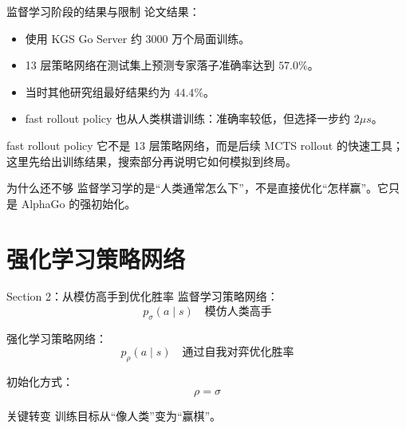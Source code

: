 \documentclass[UTF8,aspectratio=169,10pt]{ctexbeamer}
\begin{document}
\begin{frame}{监督学习阶段的结果与限制}
  \small
  论文结果：

  \begin{itemize}
    \item 使用 KGS Go Server 约 3000 万个局面训练。
    \item 13 层策略网络在测试集上预测专家落子准确率达到 $57.0\%$。
    \item 当时其他研究组最好结果约为 $44.4\%$。
    \item fast rollout policy 也从人类棋谱训练：准确率较低，但选择一步约 $2\mu s$。
  \end{itemize}

  \begin{block}{fast rollout policy}
    它不是 13 层策略网络，而是后续 MCTS rollout 的快速工具；这里先给出训练结果，搜索部分再说明它如何模拟到终局。
  \end{block}

  \begin{alertblock}{为什么还不够}
    监督学习学的是“人类通常怎么下”，不是直接优化“怎样赢”。它只是 AlphaGo 的强初始化。
  \end{alertblock}
\end{frame}

\section{强化学习策略网络}

\begin{frame}{Section 2：从模仿高手到优化胜率}
  监督学习策略网络：
  \[
    p_{\sigma}(a\mid s) \quad \text{模仿人类高手}
  \]

  强化学习策略网络：
  \[
    p_{\rho}(a\mid s) \quad \text{通过自我对弈优化胜率}
  \]

  初始化方式：
  \[
    \rho = \sigma
  \]

  \begin{block}{关键转变}
    训练目标从“像人类”变为“赢棋”。
  \end{block}
\end{frame}
\end{document}
